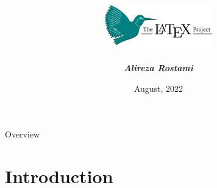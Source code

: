\documentclass[10pt,xcolor={dvipsnames}, aspectratio=169]{beamer}
\title[Shiraz University]{\includegraphics[width=0.35\textwidth]{Images/latex_long.png}}
\author{\textit{\textbf{Alireza Rostami}}}
\institute[Shiraz Universtiy]
{
	Department of Computer Science, Engineering \& IT \\
	Shiraz University
}
\date{August, 2022}
\begin{document}
\begin{frame}
  \titlepage
\end{frame}

\begin{frame}{Overview}
    \begin{multicols*}{5}
        \tableofcontents
    \end{multicols*}
\end{frame}

\section{Introduction}
\begin{frame}
    \end{frame}
\end{document}
